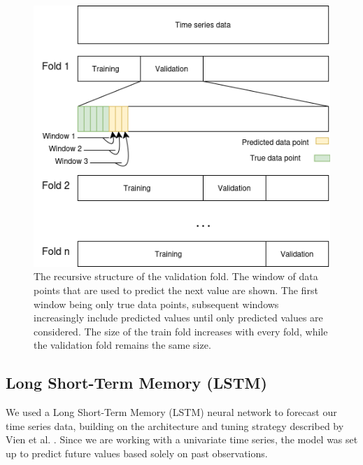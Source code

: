 \documentclass[conference]{IEEEtran}
\begin{document}
\begin{figure}
    \includegraphics[scale = 0.47]{pictures/recursivecv.drawio.png}
    \caption{The recursive structure of the validation fold. The window of data points that are used 
    to predict the next value are shown. The first window being only true data points, subsequent windows
    increasingly include predicted values until only predicted values are considered. The size of the 
    train fold increases with every fold, while the validation fold remains the same size.}
    \label{fig:recursivecv}
\end{figure}



\subsection{Long Short-Term Memory (LSTM)}
We used a Long Short-Term Memory (LSTM) neural network to forecast our time series data, building on 
the architecture and tuning strategy described by Vien et al. \cite{kuen2021machine}. Since we are working 
with a univariate time series, the model was set up to predict future values based solely on past 
observations.
\end{document}
